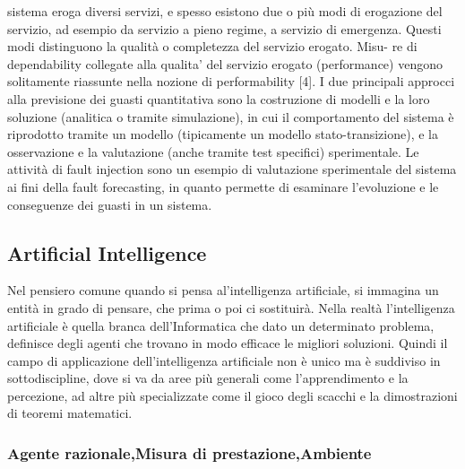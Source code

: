 \documentclass[14pt]{extarticle}
\begin{document}
sistema eroga diversi servizi, e spesso esistono due o più modi di erogazione
del servizio, ad esempio da servizio a pieno regime, a servizio di emergenza.
Questi modi distinguono la qualità o completezza del servizio erogato. Misu-
re di dependability collegate alla qualita’ del servizio erogato (performance)
vengono solitamente riassunte nella nozione di performability [4].
I due principali approcci alla previsione dei guasti quantitativa sono la
costruzione di modelli e la loro soluzione (analitica o tramite simulazione), in
cui il comportamento del sistema è riprodotto tramite un modello (tipicamente
un modello stato-transizione), e la osservazione e la valutazione (anche tramite
test specifici) sperimentale. Le attività di fault injection sono un esempio di
valutazione sperimentale del sistema ai fini della fault forecasting, in quanto
permette di esaminare l’evoluzione e le conseguenze dei guasti in un sistema.


\subsection{Artificial Intelligence}
Nel pensiero comune quando si pensa al'intelligenza artificiale, si immagina un entità in grado di pensare, che prima o poi ci sostituirà. Nella realtà l'intelligenza artificiale è quella branca dell'Informatica che dato un determinato problema, definisce degli agenti che trovano in modo efficace le migliori soluzioni. Quindi il campo di  applicazione dell'intelligenza artificiale non è unico ma è suddiviso in sottodiscipline, dove si va da aree più generali come l'apprendimento e la percezione, ad altre più specializzate come il gioco degli scacchi e la dimostrazioni di teoremi matematici.
\subsubsection{Agente razionale,Misura di prestazione,Ambiente}
\end{document}
